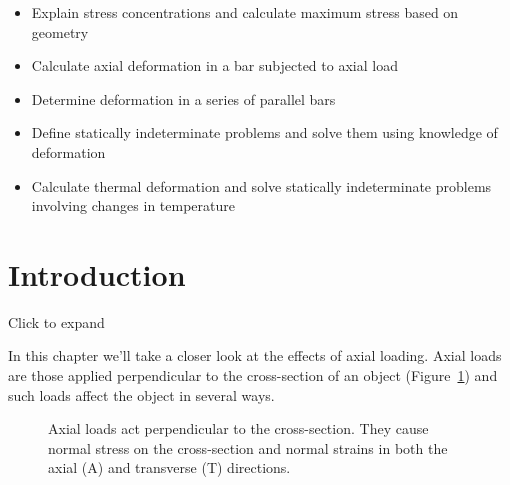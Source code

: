 \documentclass[
  letterpaper,
  DIV=11,
  numbers=noendperiod]{scrreprt}
\providecommand{\tightlist}{%
  \setlength{\itemsep}{0pt}\setlength{\parskip}{0pt}}\usepackage{longtable,booktabs,array}
\theoremstyle{definition}
\theoremstyle{remark}
\begin{document}
\begin{tcolorbox}[enhanced jigsaw, colback=white, colframe=quarto-callout-note-color-frame, toptitle=1mm, arc=.35mm, bottomrule=.15mm, toprule=.15mm, opacitybacktitle=0.6, title={Learning Objectives}, coltitle=black, breakable, colbacktitle=quarto-callout-note-color!10!white, bottomtitle=1mm, titlerule=0mm, opacityback=0, leftrule=.75mm, left=2mm, rightrule=.15mm]

\begin{itemize}
\tightlist
\item
  Explain stress concentrations and calculate maximum stress based on
  geometry
\item
  Calculate axial deformation in a bar subjected to axial load
\item
  Determine deformation in a series of parallel bars
\item
  Define statically indeterminate problems and solve them using
  knowledge of deformation
\item
  Calculate thermal deformation and solve statically indeterminate
  problems involving changes in temperature
\end{itemize}

\end{tcolorbox}

\section*{Introduction}\label{introduction-4}


Click to expand

In this chapter we'll take a closer look at the effects of axial
loading. Axial loads are those applied perpendicular to the
cross-section of an object (Figure~\ref{fig-5.1}) and such loads affect
the object in several ways.

\begin{figure}


\caption{\label{fig-5.1}Axial loads act perpendicular to the
cross-section. They cause normal stress on the cross-section and normal
strains in both the axial (A) and transverse (T) directions.}

\end{figure}%
\end{document}
